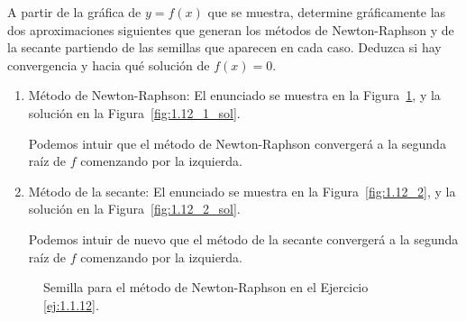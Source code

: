 \begin{ejercicio}\label{ej:1.1.12}
    A partir de la gráfica de $y = f(x)$ que se muestra, determine gráficamente las dos aproximaciones siguientes que generan los métodos de Newton-Raphson y de la secante partiendo de las semillas que aparecen en cada caso. Deduzca si hay convergencia y hacia qué solución de $f(x) = 0$.
    \begin{enumerate}
        \item Método de Newton-Raphson: El enunciado se muestra en la Figura~\ref{fig:1.12_1}, y la solución en la Figura~\ref{fig:1.12_1_sol}.
        
        Podemos intuir que el método de Newton-Raphson convergerá a la segunda raíz de $f$ comenzando por la izquierda.
        \item Método de la secante: El enunciado se muestra en la Figura~\ref{fig:1.12_2}, y la solución en la Figura~\ref{fig:1.12_2_sol}.
        
        Podemos intuir de nuevo que el método de la secante convergerá a la segunda raíz de $f$ comenzando por la izquierda.
    \end{enumerate}
\end{ejercicio}


\begin{figure}
    \centering
    \caption{Semilla para el método de Newton-Raphson en el Ejercicio \ref{ej:1.1.12}.}
    \label{fig:1.12_1}
\end{figure}

